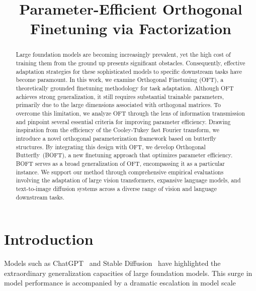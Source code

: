 \title{Parameter-Efficient Orthogonal Finetuning via Factorization}

\begin{abstract}
Large foundation models are becoming increasingly prevalent, yet the high cost of training them from the ground up presents significant obstacles. Consequently, effective adaptation strategies for these sophisticated models to specific downstream tasks have become paramount. In this work, we examine Orthogonal Finetuning (OFT), a theoretically grounded finetuning methodology for task adaptation. Although OFT achieves strong generalization, it still requires substantial trainable parameters, primarily due to the large dimensions associated with orthogonal matrices. To overcome this limitation, we analyze OFT through the lens of information transmission and pinpoint several essential criteria for improving parameter efficiency. Drawing inspiration from the efficiency of the Cooley-Tukey fast Fourier transform, we introduce a novel orthogonal parameterization framework based on butterfly structures. By integrating this design with OFT, we develop Orthogonal Butterfly~(BOFT), a new finetuning approach that optimizes parameter efficiency. BOFT serves as a broad generalization of OFT, encompassing it as a particular instance. We support our method through comprehensive empirical evaluations involving the adaptation of large vision transformers, expansive language models, and text-to-image diffusion systems across a diverse range of vision and language downstream tasks.
\end{abstract}

\section{Introduction}

Models such as ChatGPT~\cite{brown2020language,chen2021evaluating} and Stable Diffusion~\cite{rombach2022high} have highlighted the extraordinary generalization capacities of large foundation models. This surge in model performance is accompanied by a dramatic escalation in model scale

